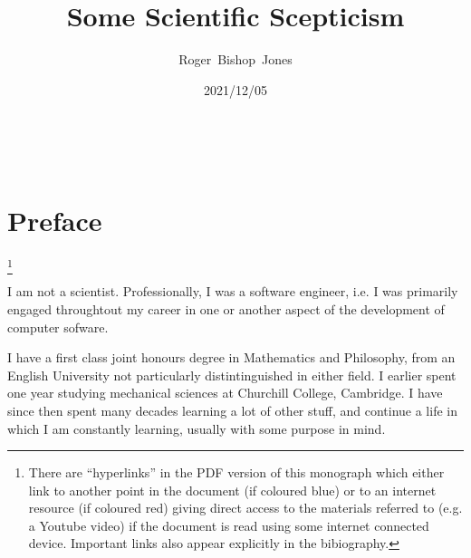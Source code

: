 \documentclass[10pt,titlepage]{book}
\title{\LARGE\bf Some Scientific Scepticism}
\author{Roger~Bishop~Jones}
\date{\small 2021/12/05}
\newcommand{\ignore}[1]{}
\begin{document}
\frontmatter

                               
\begin{titlepage}
\maketitle





\end{titlepage}

\ \

\ignore{
\begin{centering}
{}
\end{centering}
}%

\setcounter{tocdepth}{2}
{\parskip-0pt\tableofcontents}


\mainmatter

\pagebreak

\section*{Preface}


\footnote{There are ``hyperlinks'' in the PDF version of this monograph which either link to another point in the document  (if coloured blue) or to an internet resource  (if coloured red) giving direct access to the materials referred to (e.g. a Youtube video) if the document is read using some internet connected device.
Important links also appear explicitly in the bibiography.}

I am not a scientist.
Professionally, I was a software engineer, i.e. I was primarily engaged throughtout my career in one or another aspect of the development of computer sofware.

I have a first class joint honours degree in Mathematics and Philosophy, from an English University not particularly distintinguished in either field.
I earlier spent one year studying mechanical sciences at Churchill College, Cambridge.
I have since then spent many decades learning a lot of other stuff, and continue a life in which I am constantly learning, usually with some purpose in mind.
\end{document}
